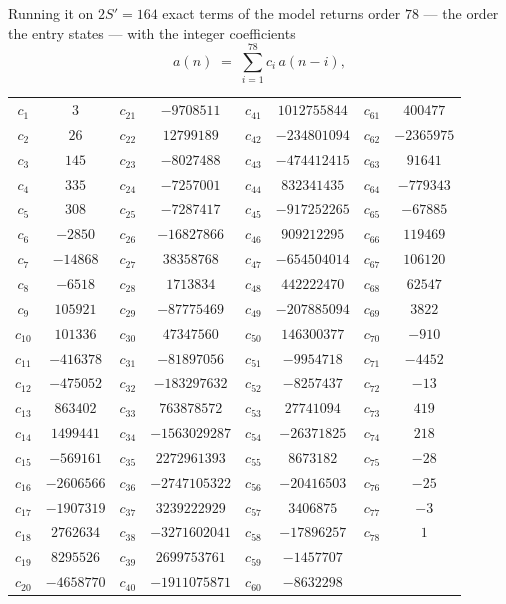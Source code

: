 \documentclass[11pt,a4paper]{article}
\theoremstyle{plain}
\theoremstyle{definition}
\begin{document}
Running it on $2S'=164$ exact terms of the model returns order $78$ --- the order the
entry states --- with the integer coefficients
\[
a(n)\;=\;\sum_{i=1}^{78}c_i\,a(n-i),
\]
\begin{center}\small
\begin{tabular}{cccccccc}
$c_{1}$ & $3$ & $c_{21}$ & $-9708511$ & $c_{41}$ & $1012755844$ & $c_{61}$ & $400477$ \\
$c_{2}$ & $26$ & $c_{22}$ & $12799189$ & $c_{42}$ & $-234801094$ & $c_{62}$ & $-2365975$ \\
$c_{3}$ & $145$ & $c_{23}$ & $-8027488$ & $c_{43}$ & $-474412415$ & $c_{63}$ & $91641$ \\
$c_{4}$ & $335$ & $c_{24}$ & $-7257001$ & $c_{44}$ & $832341435$ & $c_{64}$ & $-779343$ \\
$c_{5}$ & $308$ & $c_{25}$ & $-7287417$ & $c_{45}$ & $-917252265$ & $c_{65}$ & $-67885$ \\
$c_{6}$ & $-2850$ & $c_{26}$ & $-16827866$ & $c_{46}$ & $909212295$ & $c_{66}$ & $119469$ \\
$c_{7}$ & $-14868$ & $c_{27}$ & $38358768$ & $c_{47}$ & $-654504014$ & $c_{67}$ & $106120$ \\
$c_{8}$ & $-6518$ & $c_{28}$ & $1713834$ & $c_{48}$ & $442222470$ & $c_{68}$ & $62547$ \\
$c_{9}$ & $105921$ & $c_{29}$ & $-87775469$ & $c_{49}$ & $-207885094$ & $c_{69}$ & $3822$ \\
$c_{10}$ & $101336$ & $c_{30}$ & $47347560$ & $c_{50}$ & $146300377$ & $c_{70}$ & $-910$ \\
$c_{11}$ & $-416378$ & $c_{31}$ & $-81897056$ & $c_{51}$ & $-9954718$ & $c_{71}$ & $-4452$ \\
$c_{12}$ & $-475052$ & $c_{32}$ & $-183297632$ & $c_{52}$ & $-8257437$ & $c_{72}$ & $-13$ \\
$c_{13}$ & $863402$ & $c_{33}$ & $763878572$ & $c_{53}$ & $27741094$ & $c_{73}$ & $419$ \\
$c_{14}$ & $1499441$ & $c_{34}$ & $-1563029287$ & $c_{54}$ & $-26371825$ & $c_{74}$ & $218$ \\
$c_{15}$ & $-569161$ & $c_{35}$ & $2272961393$ & $c_{55}$ & $8673182$ & $c_{75}$ & $-28$ \\
$c_{16}$ & $-2606566$ & $c_{36}$ & $-2747105322$ & $c_{56}$ & $-20416503$ & $c_{76}$ & $-25$ \\
$c_{17}$ & $-1907319$ & $c_{37}$ & $3239222929$ & $c_{57}$ & $3406875$ & $c_{77}$ & $-3$ \\
$c_{18}$ & $2762634$ & $c_{38}$ & $-3271602041$ & $c_{58}$ & $-17896257$ & $c_{78}$ & $1$ \\
$c_{19}$ & $8295526$ & $c_{39}$ & $2699753761$ & $c_{59}$ & $-1457707$ &  &  \\
$c_{20}$ & $-4658770$ & $c_{40}$ & $-1911075871$ & $c_{60}$ & $-8632298$ &  &  \\
\end{tabular}
\end{center}
\end{document}
